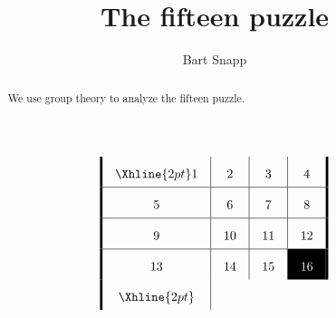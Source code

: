 \documentclass{ximera}
\author{Bart Snapp}
\title{The fifteen puzzle}
\begin{document}
\begin{abstract}
  We use group theory to analyze the fifteen puzzle.
\end{abstract}
\maketitle
\[
\arraycolsep=10pt\def\arraystretch{2}
\begin{array}{!{\vline width 2pt}c|c|c|c!{\vline width 2pt}}
    \Xhline{2pt}
    1  & 2  & 3  & 4 \\ \hline
    5  & 6  & 7  & 8 \\ \hline
    9  & 10 & 11 & 12 \\ \hline
    13 & 14 & 15 & \cellcolor{black}\textcolor{white}{16} \\
    \Xhline{2pt}
\end{array}
\]
\end{document}
